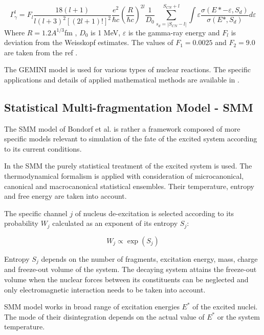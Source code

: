 \begin{equation}
    \Gamma^l_\gamma = F_l \frac{18(l+1)}{l(l+3)^2[(2l+1)!]^2} \frac{e^2}{\hbar c}\left(\frac{R}{\hbar c}\right)^{2l}\frac{1}{D_0}\sum_{s_d=\left|S_{CN}-l\right|}^{S_{CN}+l}\int\varepsilon\frac{\sigma(E*-\varepsilon,S_d)}{\sigma(E*,S_d)}d\varepsilon
\end{equation}
Where $R=1.2A^{1/3}$fm , $D_0$ is 1 MeV, $\varepsilon$ is the gamma-ray energy and $F_l$ is deviation from the Weisskopf estimates. The values of $F_1=0.0025$ and $F_2=9.0$ are taken from the ref \cite{DiGregorio1989}.
 
The GEMINI model is used for various types of nuclear reactions. The specific applications and details of applied mathematical methods are available in \cite{Charity2010}.


\subsection{Statistical Multi-fragmentation Model - SMM}

The SMM model of Bondorf et al.  \cite{SMMBondorf1995} 
is rather a framework composed of more specific models relevant to simulation of the fate of the excited system according to its current conditions.

In the SMM the purely statistical treatment of the excited system is used.
The thermodynamical formalism is applied with consideration of microcanonical, canonical and  macrocanonical statistical ensembles. 
Their temperature, entropy and free energy are taken into account.

The specific channel $j$ of nucleus de-excitation is selected according to its probability $W_j$ calculated as an exponent of its entropy $S_j$:

\begin{equation}
	W_j\propto \exp(S_j)
\end{equation}

Entropy $S_j$ depends on the number of fragments, excitation energy, mass, charge and
freeze-out volume of the system. The decaying  system attains the freeze-out volume when the nuclear forces between its 
constituents can be neglected and only electromagnetic interaction needs to be taken into account.  

SMM model works in broad range of excitation energies $E^{*}$ of the excited nuclei. The mode of their disintegration depends on the actual value of $E^{*}$ or the system temperature.

